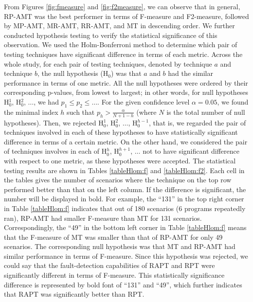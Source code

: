 \documentclass[10pt,journal,compsoc]{IEEEtran}
\begin{document}
From Figures \ref{fig:fmeasure} and \ref{fig:f2measure}, we can observe that in general, RP-AMT was the best performer in terms of F-measure and F2-measure, followed by MP-AMT, MR-AMT, RR-AMT, and MT in descending order. We further conducted hypothesis testing to verify the statistical significance of this observation. We used the Holm-Bonferroni method \cite{HolmA} to determine which pair of testing techniques have significant difference in terms of each metric. Across the whole study, for each pair of testing techniques, denoted by technique $a$ and technique $b$, the null hypothesis (H$_0$) was that $a$ and $b$ had the similar performance in terms of one metric. All the null hypotheses were ordered by their corresponding p-values, from lowest to largest; in other words, for null hypotheses H$_0^1$, H$_0^2$, $\ldots$, we had $p_1 \leq p_2 \leq \ldots$. For the given confidence level $\alpha = 0.05$, we found the minimal index $h$ such that $p_h > \displaystyle \frac{\alpha}{N+1-h}$ (where $N$ is the total number of null hypotheses). Then, we rejected H$_0^1$, H$_0^2$, $\ldots$, H$_0^{h-1}$, that is, we regarded the pair of techniques involved in each of these hypotheses to have statistically significant difference in terms of a certain metric. On the other hand, we considered the pair of techniques involves in each of H$_0^h$, H$_0^{h+1}$, $\ldots$ not to have significant difference with respect to one metric, as these hypotheses were accepted. The statistical testing results are shown in Tables \ref{tableHlom:f} and \ref{tableHlom:f2}. Each cell in the tables gives the number of scenarios where the technique on the top row performed better than that on the left column. If the difference is significant, the number will be displayed in bold. For example, the ``131'' in the top right corner in Table \ref{tableHlom:f} indicates that out of 180 scenarios (6 programs   repeatedly ran), RP-AMT had smaller F-measure than MT for 131 scenarios. Correspondingly, the ``49'' in the bottom left corner in Table \ref{tableHlom:f} means that the F-measure of MT was smaller than that of RP-AMT for only 49 scenarios. The corresponding null hypothesis was that MT and RP-AMT had similar performance in terms of F-measure. Since this hypothesis was rejected, we could say that the fault-detection capabilities of RAPT and RPT were significantly different in terms of F-measure. This statistically significance
difference is represented by bold font of ``131'' and ``49'', which further indicates that RAPT was significantly better than RPT.
\end{document}
